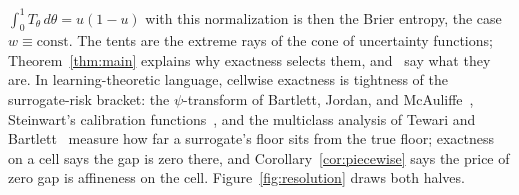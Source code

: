 \documentclass{article}
\theoremstyle{plain}
\theoremstyle{definition}
\begin{document}
$\int_0^1 T_\theta\,d\theta = u(1-u)$ with this normalization is then the Brier entropy, the case
$w\equiv\mathrm{const}$. The tents are the extreme rays of the cone of
uncertainty functions; Theorem~\ref{thm:main} explains why exactness selects
them, and~\cite[Thms~14,~16]{ReidWilliamson2011} say what they are. In learning-theoretic language,
cellwise exactness is tightness of the surrogate-risk bracket: the
$\psi$-transform of Bartlett, Jordan, and McAuliffe~\cite{BJM2006},
Steinwart's calibration functions~\cite{Steinwart2007}, and the
multiclass analysis of Tewari and
Bartlett~\cite{TewariBartlett2007} measure how far a surrogate's
floor sits from the true floor; exactness on a cell says the gap is
zero there, and Corollary~\ref{cor:piecewise} says the price of zero
gap is affineness on the cell. Figure~\ref{fig:resolution} draws
both halves.
\end{document}
